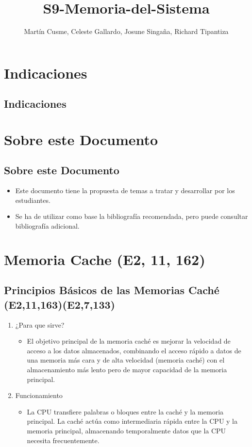 \documentclass[presentation]{beamer}
\author{Martín Cusme, Celeste Gallardo, Josune Singaña, Richard Tipantiza}
\date{}
\title{S9-Memoria-del-Sistema}
\begin{document}
\maketitle
\tableofcontents



\section{Indicaciones}
\label{sec:org01efdb0}
\subsection{Indicaciones}
\label{sec:org8cd161b}


\section{Sobre este Documento}
\label{sec:org7512190}
\subsection{Sobre este Documento}
\label{sec:orga9e434c}
\begin{itemize}
\item Este documento tiene la propuesta de temas a tratar y desarrollar por los estudiantes.
\item Se ha de utilizar como base la bibliografía recomendada, pero puede consultar bibliografía adicional.
\end{itemize}


\section{Memoria Cache (E2, 11, 162)}
\label{sec:orga7af681}
\subsection{Principios Básicos de las Memorias Caché (E2,11,163)(E2,7,133)}
\label{sec:org781b4ea}
\begin{enumerate}
\item ¿Para que sirve?
\label{sec:org19be1e6}
\begin{itemize}
\item El objetivo principal de la memoria caché es mejorar la velocidad de acceso a los datos almacenados, combinando el acceso rápido a datos de una memoria más cara y de alta velocidad (memoria caché) con el almacenamiento más lento pero de mayor capacidad de la memoria principal.
\end{itemize}

\item Funcionamiento
\label{sec:orgb00648f}
\begin{itemize}
\item La CPU transfiere palabras o bloques entre la caché y la memoria principal. La caché actúa como intermediaria rápida entre la CPU y la memoria principal, almacenando temporalmente datos que la CPU necesita frecuentemente.
\end{itemize}
\end{enumerate}
\end{document}
